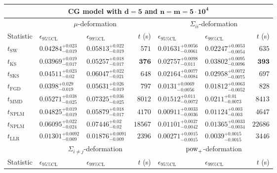 \begin{tabular}{l|llr|llr}
	\toprule
	\multicolumn{7}{c}{{\bf CG model with $\mathbf{d=5}$ and $\mathbf{n=m=5\cdot 10^{4}}$}} \\
	\toprule
	\multicolumn{1}{c}{} & \multicolumn{3}{c}{$\mu$-deformation} & \multicolumn{3}{c}{$\Sigma_{ii}$-deformation} \\
	Statistic & $\epsilon_{95\%\mathrm{CL}}$ & $\epsilon_{99\%\mathrm{CL}}$ & $t$ (s) & $\epsilon_{95\%\mathrm{CL}}$ & $\epsilon_{99\%\mathrm{CL}}$ & $t$ (s) \\
	\midrule
	$t_{\mathrm{SW}}$ & $0.04284_{-0.019}^{+0.023}$ & $0.05813_{-0.019}^{+0.022}$ & $571$ & $0.01631_{-0.0061}^{+0.0056}$ & $0.02247_{-0.0054}^{+0.0053}$ & $635$ \\
	$t_{\overline{\mathrm{KS}}}$ & ${\mathbf{0.03969_{-0.017}^{+0.019}}}$ & ${\mathbf{0.05257_{-0.017}^{+0.018}}}$ & ${\mathbf{376}}$ & $0.02757_{-0.011}^{+0.0098}$ & $0.03802_{-0.0096}^{+0.0095}$ & ${\mathbf{393}}$ \\
	$t_{\mathrm{SKS}}$ & $0.04511_{-0.02}^{+0.023}$ & $0.06047_{-0.021}^{+0.022}$ & $648$ & $0.02164_{-0.0084}^{+0.0077}$ & $0.02958_{-0.0075}^{+0.0072}$ & $697$ \\
	$t_{\mathrm{FGD}}$ & $0.0398_{-0.019}^{+0.029}$ & $0.05631_{-0.019}^{+0.026}$ & $797$ & ${\mathbf{0.0131_{-0.0056}^{+0.0069}}}$ & ${\mathbf{0.01812_{-0.0052}^{+0.0063}}}$ & $828$ \\
	$t_{\mathrm{MMD}}$ & $0.05271_{-0.025}^{+0.038}$ & $0.07325_{-0.025}^{+0.036}$ & $8012$ & $0.01512_{-0.0072}^{+0.011}$ & $0.0211_{-0.0073}^{+0.01}$ & $8413$ \\
\rowcolor{red!35}	$t_{\mathrm{NPLM}}$ & $0.04825_{-0.019}^{+0.019}$ & $0.05879_{-0.017}^{+0.018}$ & $4170$ & $0.00911_{-0.0036}^{+0.0033}$ & $0.01124_{-0.003}^{+0.003}$ & $4647$ \\
\rowcolor{blue!35}	$t_{\mathrm{NPLM}}$ & $0.06095_{-0.024}^{+0.022}$ & $0.07446_{-0.02}^{+0.02}$ & $18567$ & $0.01101_{-0.0042}^{+0.0037}$ & $0.01365_{-0.0034}^{+0.0033}$ & $22686$ \\
	$t_{\mathrm{LLR}}$ & $0.01301_{-0.009}^{+0.0092}$ & $0.01876_{-0.009}^{+0.0091}$ & $2396$ & $0.00271_{-0.0015}^{+0.0015}$ & $0.0039_{-0.0015}^{+0.0015}$ & $3446$ \\
	\toprule
	\multicolumn{1}{c}{} & \multicolumn{3}{c}{$\Sigma_{i\neq j}$-deformation} & \multicolumn{3}{c}{$\rm{pow}_{+}$-deformation} \\
	Statistic & $\epsilon_{95\%\mathrm{CL}}$ & $\epsilon_{99\%\mathrm{CL}}$ & $t$ (s) & $\epsilon_{95\%\mathrm{CL}}$ & $\epsilon_{99\%\mathrm{CL}}$ & $t$ (s) \\

\end{tabular}
